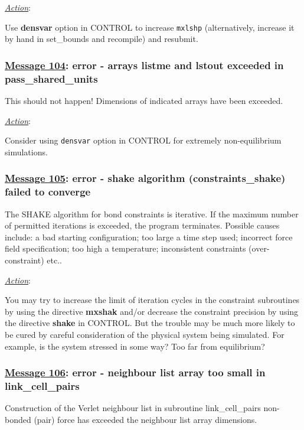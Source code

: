 \noindent \underline{\em Action}:

Use {\bf densvar} option in CONTROL to increase {\tt mxlshp}
(alternatively, increase it by hand in {\sc set\_bounds} and
recompile) and resubmit.

\subsubsection*{\underline{Message 104}: error - arrays listme and lstout exceeded in pass\_shared\_units}

This should not happen!  Dimensions of indicated arrays have been
exceeded.

\noindent \underline{\em Action}:

Consider using {\tt densvar} option in CONTROL for extremely
non-equilibrium simulations.

\subsubsection*{\underline{Message 105}: error - shake algorithm (constraints\_shake) failed to converge}

The SHAKE algorithm for bond
constraints is iterative.  If the maximum
number of permitted iterations is exceeded, the program
terminates.  Possible causes include: a bad starting
configuration; too large a time step used; incorrect force
field specification; too high a temperature;
inconsistent constraints (over-constraint) etc..

\noindent \underline{\em Action}:

You may try to increase the limit of iteration cycles in the
constraint subroutines by using the directive {\bf mxshak} and/or
decrease the constraint precision by using the directive {\bf shake}
in CONTROL.  But the trouble may be much more likely to be cured by
careful consideration of the physical system being simulated.  For
example, is the system stressed in some way? Too far from
equilibrium?

\subsubsection*{\underline{Message 106}: error - neighbour list array too small in link\_cell\_pairs}

Construction of the Verlet neighbour list in subroutine {\sc link\_cell\_pairs} non-bonded (pair) force
has exceeded the neighbour list array dimensions.

